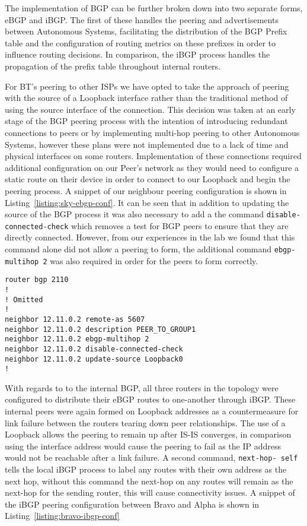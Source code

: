 The implementation of BGP can be further broken down into two separate forms,
eBGP and iBGP. The first of these handles the peering and advertisements between
Autonomous Systems, facilitating the distribution of the BGP Prefix table and
the configuration of routing metrics on these prefixes in order to influence
routing decisions. In comparison, the iBGP process handles the propagation of
the prefix table throughout internal routers.

For BT's peering to other ISPs we have opted to take the approach of peering
with the source of a Loopback interface rather than the traditional method of
using the source interface of the connection. This decision was taken at an
early stage of the BGP peering process with the intention of introducing
redundant connections to peers or by implementing multi-hop peering to other
Autonomous Systems, however these plans were not implemented due to a lack of
time and physical interfaces on some routers. Implementation of these
connections required additional configuration on our Peer's network as they
would need to configure a static route on their device in order to connect to
our Loopback and begin the peering process. A snippet of our neighbour peering
configuration is shown in Listing~\ref{listing:sky-ebgp-conf}. It can be seen
that in addition to updating the source of the BGP process it was also necessary
to add a the command \texttt{disable-connected-check} which removes a test for
BGP peers to ensure that they are directly connected. However, from our
experiences in the lab we found that this command alone did not allow a peering
to form, the additional command \texttt{ebgp-multihop 2} was also required in
order for the peers to form correctly.

\begin{lstlisting}[caption={BT-Sky eBGP Configuration}, label={listing:sky-ebgp-conf}]
router bgp 2110
!
! Omitted
!
neighbor 12.11.0.2 remote-as 5607
neighbor 12.11.0.2 description PEER_TO_GROUP1
neighbor 12.11.0.2 ebgp-multihop 2
neighbor 12.11.0.2 disable-connected-check
neighbor 12.11.0.2 update-source Loopback0
!
\end{lstlisting}

With regards to to the internal BGP, all three routers in the topology were
configured to distribute their eBGP routes to one-another through iBGP. These
internal peers were again formed on Loopback addresses as a countermeasure for
link failure between the routers tearing down peer relationships. The use of a
Loopback allows the peering to remain up after IS-IS converges, in comparison
using the interface address would cause the peering to fail as the IP address
would not be reachable after a link failure. A second command, \texttt{next-hop-
self} tells the local iBGP process to label any routes with their own address as
the next hop, without this command the next-hop on any routes will remain as the
next-hop for the sending router, this will cause connectivity issues. A snippet
of the iBGP peering configuration between Bravo and Alpha is shown in
Listing~\ref{listing:bravo-ibgp-conf}

